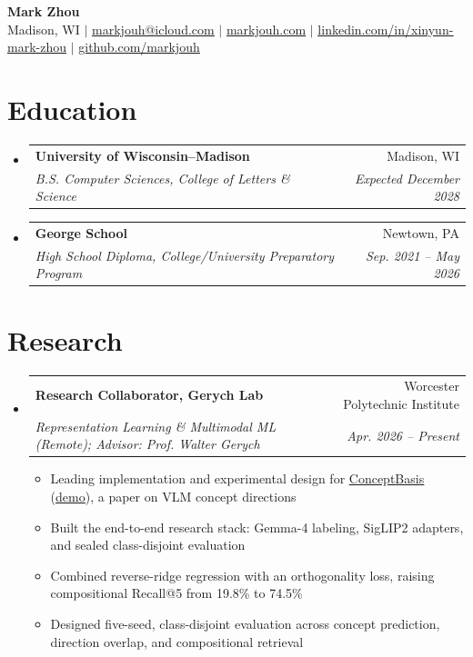 \documentclass[letterpaper,11pt]{article}
\makeatletter
\newcommand{\resumeItem}[1]{
  \item\small{
    {#1 \vspace{-2pt}}
  }
}
\newcommand{\resumeSubheading}[4]{
  \vspace{-2pt}\item
    \begin{tabular*}{0.97\textwidth}[t]{l@{\extracolsep{\fill}}r}
      \textbf{#1} & #2 \\
      \textit{\small#3} & \textit{\small #4} \\
    \end{tabular*}\vspace{-7pt}
}
\newcommand{\resumeSubHeadingListStart}{\begin{itemize}[leftmargin=0.15in, label={}]}
\newcommand{\resumeSubHeadingListEnd}{\end{itemize}}
\newcommand{\resumeItemListStart}{\begin{itemize}}
\newcommand{\resumeItemListEnd}{\end{itemize}\vspace{-5pt}}
\makeatother
\begin{document}
\begin{center}
    \textbf{\Huge Mark Zhou} \\ \vspace{1pt}
    \small Madison, WI $|$ \href{mailto:markjouh@icloud.com}{\underline{markjouh@icloud.com}} $|$
    \href{https://markjouh.com}{\underline{markjouh.com}} $|$
    \href{https://www.linkedin.com/in/xinyun-mark-zhou/}{\underline{linkedin.com/in/xinyun-mark-zhou}} $|$
    \href{https://github.com/markjouh}{\underline{github.com/markjouh}}
\end{center}

\section{Education}
  \resumeSubHeadingListStart
    \resumeSubheading
      {University of Wisconsin--Madison}{Madison, WI}
      {B.S. Computer Sciences, College of Letters \& Science}{Expected December 2028}
    \resumeSubheading
      {George School}{Newtown, PA}
      {High School Diploma, College/University Preparatory Program}{Sep. 2021 -- May 2026}
  \resumeSubHeadingListEnd

\section{Research}
  \resumeSubHeadingListStart
    \resumeSubheading
      {Research Collaborator, Gerych Lab}{Worcester Polytechnic Institute}
      {Representation Learning \& Multimodal ML (Remote); Advisor: Prof. Walter Gerych}{Apr. 2026 -- Present}
      \resumeItemListStart
        \resumeItem{Leading implementation and experimental design for \href{https://github.com/markjouh/conceptbasis}{\underline{ConceptBasis}} (\href{https://markjouh.github.io/conceptbasis/playground.html}{\underline{demo}}), a paper on VLM concept directions}
        \resumeItem{Built the end-to-end research stack: Gemma-4 labeling, SigLIP2 adapters, and sealed class-disjoint evaluation}
        \resumeItem{Combined reverse-ridge regression with an orthogonality loss, raising compositional Recall@5 from 19.8\% to 74.5\%}
        \resumeItem{Designed five-seed, class-disjoint evaluation across concept prediction, direction overlap, and compositional retrieval}
      \resumeItemListEnd
  \resumeSubHeadingListEnd

\end{document}
